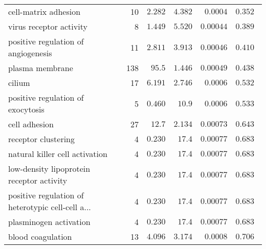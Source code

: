 \begin{longtable}{|l|r|r|r|r|r|}
                              cell-matrix adhesion &                      10 &                $ 2.282$ &   $ 4.382$ &             $0.0004$ &                    $ 0.352~~$ \\
                           virus receptor activity &                       8 &                $ 1.449$ &   $ 5.520$ &            $0.00044$ &                    $ 0.389~~$ \\
               positive regulation of angiogenesis &                      11 &                $ 2.811$ &   $ 3.913$ &            $0.00046$ &                    $ 0.410~~$ \\
                                   plasma membrane &                     138 &                $  95.5$ &   $ 1.446$ &            $0.00049$ &                    $ 0.438~~$ \\
                                            cilium &                      17 &                $ 6.191$ &   $ 2.746$ &             $0.0006$ &                    $ 0.532~~$ \\
                 positive regulation of exocytosis &                       5 &                $ 0.460$ &   $  10.9$ &             $0.0006$ &                    $ 0.533~~$ \\
                                     cell adhesion &                      27 &                $  12.7$ &   $ 2.134$ &            $0.00073$ &                    $ 0.643~~$ \\
                               receptor clustering &                       4 &                $ 0.230$ &   $  17.4$ &            $0.00077$ &                    $ 0.683~~$ \\
                    natural killer cell activation &                       4 &                $ 0.230$ &   $  17.4$ &            $0.00077$ &                    $ 0.683~~$ \\
         low-density lipoprotein receptor activity &                       4 &                $ 0.230$ &   $  17.4$ &            $0.00077$ &                    $ 0.683~~$ \\
 positive regulation of heterotypic cell-cell a... &                       4 &                $ 0.230$ &   $  17.4$ &            $0.00077$ &                    $ 0.683~~$ \\
                            plasminogen activation &                       4 &                $ 0.230$ &   $  17.4$ &            $0.00077$ &                    $ 0.683~~$ \\
                                 blood coagulation &                      13 &                $ 4.096$ &   $ 3.174$ &             $0.0008$ &                    $ 0.706~~$ \\

\end{longtable}
